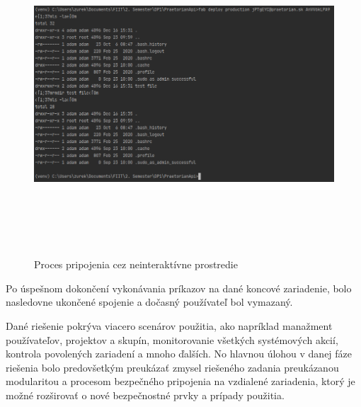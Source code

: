 \begin{figure}[H]
\begin{center}\includegraphics[width=\textwidth,height=12cm,keepaspectratio=true]{assets/non_interactive_session.png}\end{center}
\caption[Proces pripojenia cez neinteraktívne prostredie]{Proces pripojenia cez neinteraktívne prostredie}\label{fig:obr_18}
\end{figure}

Po úspešnom dokončení vykonávania príkazov na dané koncové zariadenie, bolo nasledovne ukončené spojenie a dočasný používateľ
bol vymazaný.

Dané riešenie pokrýva viacero scenárov použitia, ako napríklad manažment používateľov, projektov a skupín, monitorovanie
všetkých systémových akcií, kontrola povolených zariadení a mnoho ďalších.
No hlavnou úlohou v danej fáze riešenia bolo predovšetkým preukázať zmysel riešeného zadania preukázanou modularitou a procesom
bezpečného pripojenia na vzdialené zariadenia, ktorý je možné rozširovať o nové bezpečnostné prvky a prípady použitia.
